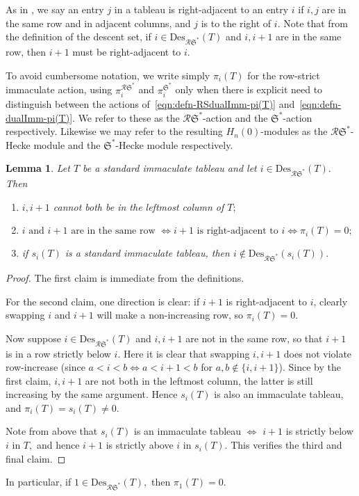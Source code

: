 \documentclass[12pt,letterpaper]{amsart}
\newtheorem{lemma}[theorem]{Lemma}
\theoremstyle{definition}
\newcommand{\dI}{\mathfrak{S}^*}
\newcommand{\rdI}{\mathcal{R}\mathfrak{S}^*}
\newcommand{\hn}{H_n(0)}
\begin{document}
As in \cite{BS2021}, we say an entry $j$ in a tableau is right-adjacent to an entry $i$ if $i,j$ are in the same row and in adjacent columns, and $j$ is to the right of $i$.    Note that from the definition of the descent set, if 
$i\in \mathrm{Des}_{\mathcal{R}\mathfrak{S^*}}(T)$ and $i, i+1$ are in the same row, then $i+1$ must be right-adjacent to $i.$ 

To avoid cumbersome notation, we write simply $\pi_i(T)$ for the row-strict immaculate action, using 
   $\pi_i^{\rdI}$ and $\pi_i^{\dI}$ only when there is explicit need to distinguish between the actions of~\eqref{eqn:defn-RSdualImm-pi(T)} and~\eqref{eqn:defn-dualImm-pi(T)}.  We refer to these as the $\rdI$-action and the $\dI$-action respectively.  Likewise we may refer to the resulting $\hn$-modules as the  $\rdI$-Hecke module and the $\dI$-Hecke module respectively.
\begin{lemma}\label{lem:prelim} Let $T$ be a standard immaculate tableau and let $i\in \mathrm{Des}_{\mathcal{R}\mathfrak{S^*}}(T).$  Then 
\begin{enumerate}
\item
$i, i+1$ cannot both be in the leftmost column of $T;$
\item 
$ i \text{ and } i+1 \text{ are in the same row } \iff i+1\text{ is right-adjacent to }i \iff \pi_i(T)=0;$
\item if $s_i(T)$ is a standard immaculate tableau, then $i\notin \mathrm{Des}_{\mathcal{R}\mathfrak{S^*}}(s_i(T)).$
\end{enumerate}
\end{lemma}
\begin{proof} The first claim is immediate from the definitions. 

For the second claim, one direction is clear: if $i+1$ is right-adjacent to $i$, clearly swapping $i$ and $i+1$ will make a non-increasing row, so $\pi_i(T)=0.$ 

Now suppose $i\in \mathrm{Des}_{\mathcal{R}\mathfrak{S^*}}(T)$ and $i, i+1$ are not in the same row, so that $i+1$ is in a row strictly below $i.$  Here it is clear that swapping $i, i+1$ does not violate row-increase (since $a<i<b\iff a<i+1<b$ for $a, b \notin \{i,i+1\}$).  Since by the first claim, $i, i+1$ are not both in the leftmost column, the latter is still increasing by the same argument.  Hence $s_i(T)$ is also an immaculate tableau, and $\pi_i(T)=s_i(T)\ne 0.$

Note from above that $s_i(T) $ is an immaculate tableau $\iff$ $i+1$ is strictly below $i$ in $T,$ and hence $i+1$ is strictly above $i$ in $s_i(T).$ This verifies the third and final claim.
\end{proof}
In particular, if $1\in \mathrm{Des}_{\mathcal{R}\mathfrak{S^*}}(T),$ then $\pi_1(T)=0.$ 
\end{document}
